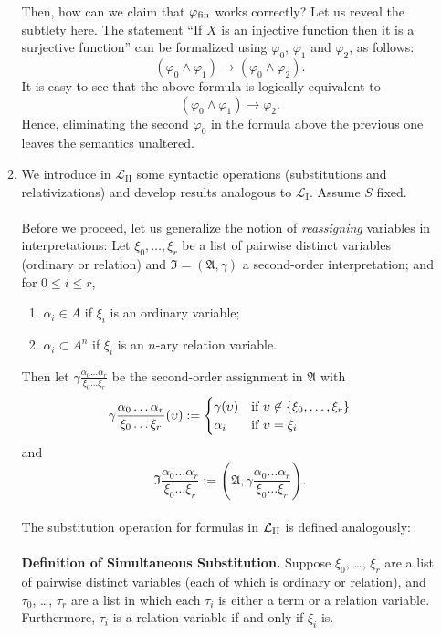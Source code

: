 \begin{enumerate}[1.]
\begin{enumerate}[(1)]
Then, how can we claim that $\varphi_{\mbox{\scriptsize fin}}$ works correctly? Let us reveal the subtlety here. The statement ``If $X$ is an injective function then it is a surjective function'' can be formalized using $\varphi_0$, $\varphi_1$ and $\varphi_2$, as follows:
\[
(\varphi_0 \land \varphi_1) \rightarrow (\varphi_0 \land \varphi_2).
\]
It is easy to see that the above formula is logically equivalent to
\[
(\varphi_0 \land \varphi_1) \rightarrow \varphi_2.
\]
Hence, eliminating the second $\varphi_0$ in the formula above the previous one leaves the semantics unaltered.
\item We introduce in $\mathcal{L}_\mathrm{II}$ some syntactic operations (substitutions and relativizations) and develop results analogous to $\mathcal{L}_\mathrm{I}$. Assume $S$ fixed.\\
\ \\
Before we proceed, let us generalize the notion of \emph{reassigning} variables in interpretations: Let $\xi_0, \ldots, \xi_r$ be a list of pairwise distinct variables (ordinary or relation) and $\mathfrak{I} = (\mathfrak{A}, \gamma)$ a second-order interpretation; and for $0 \leq i \leq r$,
\begin{enumerate}[1)]
\item $\alpha_i \in A$ if $\xi_i$ is an ordinary variable;
\item $\alpha_i \subset A^n$ if $\xi_i$ is an $n$-ary relation variable.
\end{enumerate}
Then let $\gamma \displaystyle\frac{\alpha_0 \ldots \alpha_r}{\xi_0 \ldots \xi_r}$ be the second-order assignment in $\mathfrak{A}$ with
\[
\gamma \frac{\alpha_0 \ldots \alpha_r}{\xi_0 \ldots \xi_r} (\upsilon) := \begin{cases}
\gamma (\upsilon) & \mbox{if \(\upsilon \not\in \{ \xi_0, \ldots, \xi_r \}\)} \cr
\alpha_i & \mbox{if \(\upsilon = \xi_i\)}
\end{cases}
\]
and
\[
\mathfrak{I} \frac{\alpha_0 \ldots \alpha_r}{\xi_0 \ldots \xi_r} := \left( \mathfrak{A}, \gamma\frac{\alpha_0 \ldots \alpha_r}{\xi_0 \ldots \xi_r} \right).
\]
\ \\
The substitution operation for formulas in $\mathcal{L}_{\mbox{\scriptsize II}}$ is defined analogously:\\
\ \\
\textbf{Definition of Simultaneous Substitution.} Suppose $\xi_0$, \ldots, $\xi_r$ are a list of pairwise distinct variables (each of which is ordinary or relation), and $\tau_0$, \ldots, $\tau_r$ are a list in which each $\tau_i$ is either a term or a relation variable. Furthermore, $\tau_i$ is a relation variable if and only if $\xi_i$ is.\\

\end{enumerate}
\end{enumerate}
